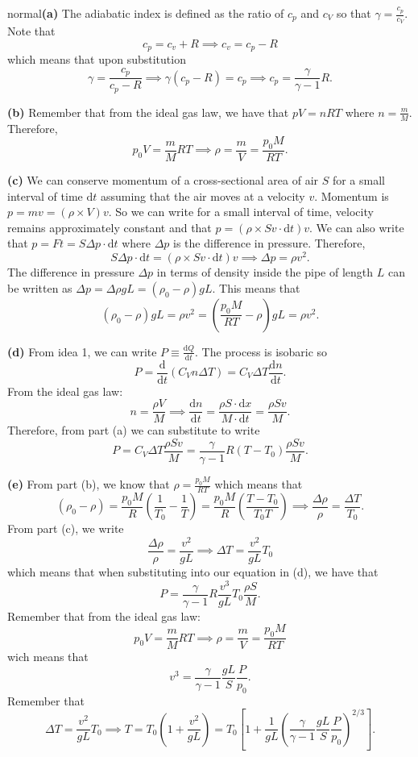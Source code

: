 \begin{solution}{normal}\textbf{(a)} The adiabatic index is defined as the ratio of $c_p$ and $c_V$ so that $\gamma = \frac{c_p}{c_V}$. Note that 
\[c_p = c_v + R\implies c_v = c_p - R\]
which means that upon substitution 
\[\gamma = \frac{c_p}{c_p - R}\implies \gamma (c_p - R) = c_p\implies c_p = \frac{\gamma}{\gamma - 1}R.\]
\vspace{3mm}

\noindent \textbf{(b)} Remember that from the ideal gas law, we have that $pV = nRT$ where $n = \frac{m}{M}$. Therefore, 
\[p_0 V = \frac{m}{M}RT\implies \rho = \frac{m}{V} = \frac{p_0 M}{RT}.\]
\vspace{3mm}

\noindent \textbf{(c)} We can conserve momentum of a cross-sectional area of air $S$ for a small interval of time $\text{d}t$ assuming that the air moves at a velocity $v$. Momentum is $p = mv = (\rho \times V)v$. So we can write for a small interval of time, velocity remains approximately constant and that $p = (\rho \times Sv\cdot \text{d}t)v$. We can also write that $p = Ft = S\Delta p \cdot \text{d}t$ where $\Delta p$ is the difference in pressure. Therefore, 
\[S\Delta p \cdot \text{d}t = (\rho \times Sv\cdot \text{d}t)v\implies \Delta p = \rho v^2.\]
The difference in pressure $\Delta p$ in terms of density inside the pipe of length $L$ can be written as $\Delta p = \Delta \rho gL = (\rho_0 - \rho)gL$. This means that 
\[(\rho_0 - \rho)gL = \rho v^2 = \left(\frac{p_0 M}{RT} - \rho\right)gL = \rho v^2.\]
\vspace{3mm}

\noindent \textbf{(d)} From idea 1, we can write $P \equiv \frac{\text{d}Q}{\text{d}t}$. The process is isobaric so 
\[P = \frac{\text{d}}{\text{d} t}\left(C_V n\Delta T\right) = C_V \Delta T\frac{\text{d}n}{\text{d}t}.\]
From the ideal gas law:
\[n = \frac{\rho V}{M}\implies \frac{\text{d}n}{\text{d}t} = \frac{\rho S \cdot \text{d}x}{M\cdot \text{d}t} = \frac{\rho Sv}{M}.\]
Therefore, from part (a) we can substitute to write
\[P = C_V \Delta T \frac{\rho Sv}{M} = \frac{\gamma}{\gamma - 1}R (T - T_0) \frac{\rho Sv}{M}.\]
\vspace{3mm}

\noindent \textbf{(e)} From part (b), we know that $\rho = \frac{p_0 M}{RT}$ which means that 
\[(\rho_0 - \rho) = \frac{p_0 M}{R} \left(\frac{1}{T_0} - \frac{1}{T}\right) = \frac{p_0 M}{R} \left(\frac{T - T_0}{T_0 T}\right)\implies \frac{\Delta \rho}{\rho} = \frac{\Delta T}{T_0}.\]
From part (c), we write 
\[\frac{\Delta \rho}{\rho} = \frac{v^2}{gL}\implies \Delta T = \frac{v^2}{gL}T_0\]
which means that when substituting into our equation in (d), we have that 
\[P = \frac{\gamma}{\gamma - 1}R \frac{v^3}{gL}T_0\frac{\rho S}{M}.\]
Remember that from the ideal gas law:
\[p_0 V = \frac{m}{M}RT\implies \rho = \frac{m}{V} = \frac{p_0 M}{RT}\]
wich means that 
\[v^3 = \frac{\gamma}{\gamma - 1} \frac{gL}{S}\frac{P}{p_0}.\]
Remember that 
\[\Delta T = \frac{v^2}{gL}T_0\implies T = T_0 \left(1 + \frac{v^2}{gL}\right) = T_0 \left[1 + \frac{1}{gL}\left( \frac{\gamma}{\gamma - 1} \frac{gL}{S}\frac{P}{p_0}\right)^{2/3}\right].\]

\end{solution}
